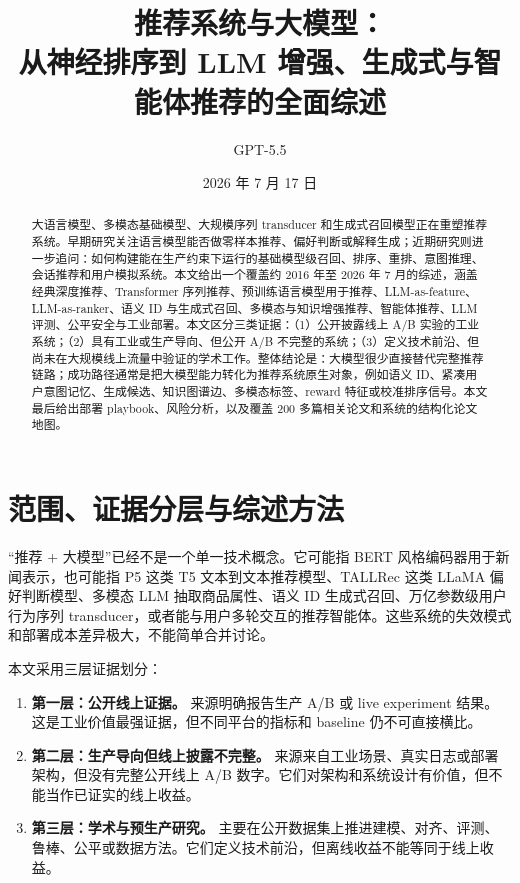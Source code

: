 \documentclass[UTF8,fontset=fandol,11pt]{ctexart}
\title{推荐系统与大模型：\\从神经排序到 LLM 增强、生成式与智能体推荐的全面综述}
\author{GPT-5.5}
\date{2026 年 7 月 17 日}
\begin{document}
\maketitle

\begin{abstract}
大语言模型、多模态基础模型、大规模序列 transducer 和生成式召回模型正在重塑推荐系统。早期研究关注语言模型能否做零样本推荐、偏好判断或解释生成；近期研究则进一步追问：如何构建能在生产约束下运行的基础模型级召回、排序、重排、意图推理、会话推荐和用户模拟系统。本文给出一个覆盖约 2016 年至 2026 年 7 月的综述，涵盖经典深度推荐、Transformer 序列推荐、预训练语言模型用于推荐、LLM-as-feature、LLM-as-ranker、语义 ID 与生成式召回、多模态与知识增强推荐、智能体推荐、LLM 评测、公平安全与工业部署。本文区分三类证据：（1）公开披露线上 A/B 实验的工业系统；（2）具有工业或生产导向、但公开 A/B 不完整的系统；（3）定义技术前沿、但尚未在大规模线上流量中验证的学术工作。整体结论是：大模型很少直接替代完整推荐链路；成功路径通常是把大模型能力转化为推荐系统原生对象，例如语义 ID、紧凑用户意图记忆、生成候选、知识图谱边、多模态标签、reward 特征或校准排序信号。本文最后给出部署 playbook、风险分析，以及覆盖 200 多篇相关论文和系统的结构化论文地图。
\end{abstract}

\tableofcontents

\section{范围、证据分层与综述方法}

“推荐 + 大模型”已经不是一个单一技术概念。它可能指 BERT 风格编码器用于新闻表示，也可能指 P5 这类 T5 文本到文本推荐模型、TALLRec 这类 LLaMA 偏好判断模型、多模态 LLM 抽取商品属性、语义 ID 生成式召回、万亿参数级用户行为序列 transducer，或者能与用户多轮交互的推荐智能体。这些系统的失效模式和部署成本差异极大，不能简单合并讨论。

本文采用三层证据划分：

\begin{enumerate}
  \item \textbf{第一层：公开线上证据。} 来源明确报告生产 A/B 或 live experiment 结果。这是工业价值最强证据，但不同平台的指标和 baseline 仍不可直接横比。
  \item \textbf{第二层：生产导向但线上披露不完整。} 来源来自工业场景、真实日志或部署架构，但没有完整公开线上 A/B 数字。它们对架构和系统设计有价值，但不能当作已证实的线上收益。
  \item \textbf{第三层：学术与预生产研究。} 主要在公开数据集上推进建模、对齐、评测、鲁棒、公平或数据方法。它们定义技术前沿，但离线收益不能等同于线上收益。
\end{enumerate}
\end{document}
